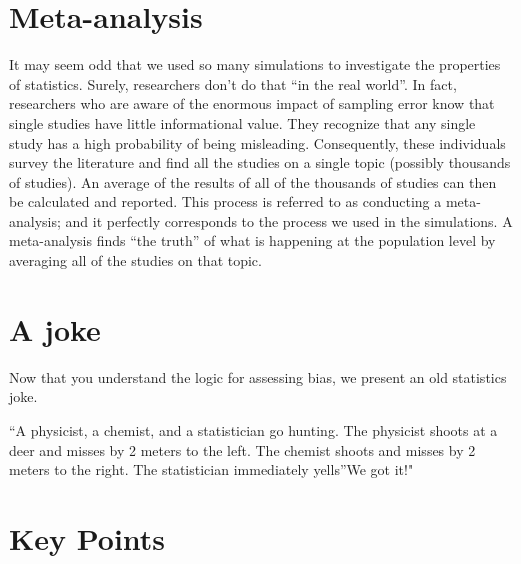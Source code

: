 \documentclass[
]{krantz}
\renewenvironment{quote}{\begin{VF}}{\end{VF}}
\begin{document}
\singlespacing

\hypertarget{meta-analysis}{%
\section{Meta-analysis}\label{meta-analysis}}

It may seem odd that we used so many simulations to investigate the properties of statistics. Surely, researchers don't do that ``in the real world''. In fact, researchers who are aware of the enormous impact of sampling error know that single studies have little informational value. They recognize that any single study has a high probability of being misleading. Consequently, these individuals survey the literature and find all the studies on a single topic (possibly thousands of studies). An average of the results of all of the thousands of studies can then be calculated and reported. This process is referred to as conducting a meta-analysis; and it perfectly corresponds to the process we used in the simulations. A meta-analysis finds ``the truth'' of what is happening at the population level by averaging all of the studies on that topic.

\hypertarget{a-joke}{%
\section{A joke}\label{a-joke}}

Now that you understand the logic for assessing bias, we present an old statistics joke.

\begin{quote}
``A physicist, a chemist, and a statistician go hunting. The physicist shoots at a deer and misses by 2 meters to the left. The chemist shoots and misses by 2 meters to the right. The statistician immediately yells''We got it!"
\end{quote}

\hypertarget{key-points-1}{%
\section{Key Points}\label{key-points-1}}
\end{document}
